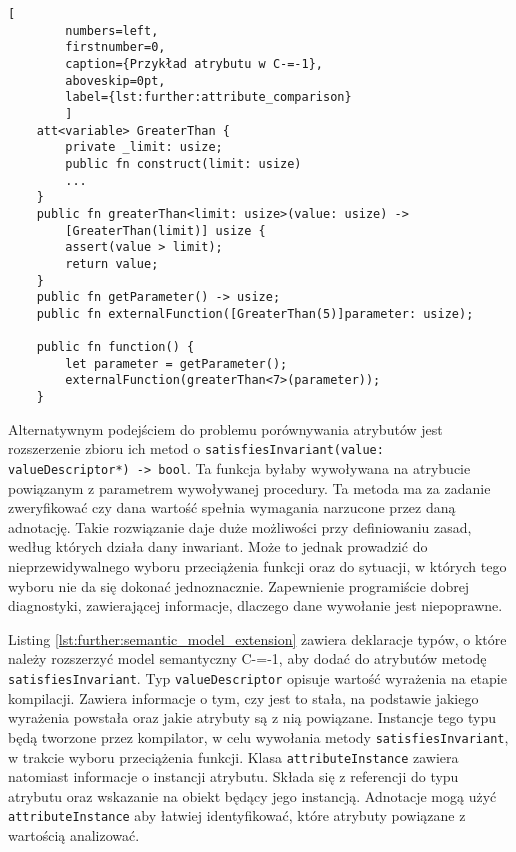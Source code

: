 \begin{minipage}{\textwidth}
	
	\begin{lstlisting}[
		numbers=left,
		firstnumber=0,
		caption={Przykład atrybutu w C-=-1},
		aboveskip=0pt,
		label={lst:further:attribute_comparison}
		]
	att<variable> GreaterThan {
		private _limit: usize;
		public fn construct(limit: usize)
		...
	}
	public fn greaterThan<limit: usize>(value: usize) -> 
		[GreaterThan(limit)] usize {
		assert(value > limit);
		return value;
	}
	public fn getParameter() -> usize;
	public fn externalFunction([GreaterThan(5)]parameter: usize);
	
	public fn function() {
		let parameter = getParameter();
		externalFunction(greaterThan<7>(parameter));
	}
	\end{lstlisting}
	
\end{minipage}
Alternatywnym podejściem do problemu porównywania atrybutów jest rozszerzenie zbioru ich metod o \lstinline{satisfiesInvariant(value: valueDescriptor*) -> bool}.
Ta funkcja byłaby wywoływana na atrybucie powiązanym z parametrem wywoływanej procedury.
Ta metoda ma za zadanie zweryfikować czy dana wartość spełnia wymagania narzucone przez daną adnotację.
Takie rozwiązanie daje duże możliwości przy definiowaniu zasad, według których działa dany inwariant.
Może to jednak prowadzić do nieprzewidywalnego wyboru przeciążenia funkcji oraz do sytuacji, w których tego wyboru nie da się dokonać jednoznacznie.
Zapewnienie programiście dobrej diagnostyki, zawierającej informacje, dlaczego dane wywołanie jest niepoprawne.

Listing \ref{lst:further:semantic_model_extension} zawiera deklaracje typów, o które należy rozszerzyć model semantyczny C-=-1, aby dodać do atrybutów metodę \lstinline{satisfiesInvariant}.
Typ \lstinline{valueDescriptor} opisuje wartość wyrażenia na etapie kompilacji.
Zawiera informacje o tym, czy jest to stała, na podstawie jakiego wyrażenia powstała oraz jakie atrybuty są z nią powiązane.
Instancje tego typu będą tworzone przez kompilator, w celu wywołania metody \lstinline{satisfiesInvariant}, w trakcie wyboru przeciążenia funkcji.
Klasa \lstinline{attributeInstance} zawiera natomiast informacje o instancji atrybutu.
Składa się z referencji do typu atrybutu oraz wskazanie na obiekt będący jego instancją.
Adnotacje mogą użyć \lstinline{attributeInstance} aby łatwiej identyfikować, które atrybuty powiązane z wartością analizować.

